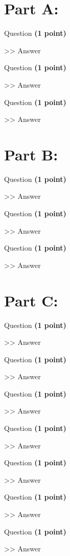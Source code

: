 \documentclass[12pt,a4paper]{article}
\begin{document}
\raggedright
\section*{Part A: }
\begin{enumerate}[font=\bfseries, wide]
    {\color{under}\item Question \textbf{(1 point)}}\par
    >> Answer
    {\color{under}\item Question \textbf{(1 point)}}\par
    >> Answer
    {\color{under}\item Question \textbf{(1 point)}}\par
    >> Answer
\end{enumerate}

\section*{Part B: }
\begin{enumerate}[font=\bfseries, wide, resume]
    {\color{under}\item Question \textbf{(1 point)}}\par
    >> Answer
    {\color{under}\item Question \textbf{(1 point)}}\par
    >> Answer
    {\color{under}\item Question \textbf{(1 point)}}\par
    >> Answer
\end{enumerate}
    
\section*{Part C: }
\begin{enumerate}[font=\bfseries, wide, resume]
    {\color{under}\item Question \textbf{(1 point)}}\par
    >> Answer
    {\color{under}\item Question \textbf{(1 point)}}\par
    >> Answer
    {\color{under}\item Question \textbf{(1 point)}}\par
    >> Answer
    {\color{under}\item Question \textbf{(1 point)}}\par
    >> Answer
    {\color{under}\item Question \textbf{(1 point)}}\par
    >> Answer
    {\color{under}\item Question \textbf{(1 point)}}\par
    >> Answer
    {\color{under}\item Question \textbf{(1 point)}}\par
    >> Answer
\end{enumerate}
\end{document}
